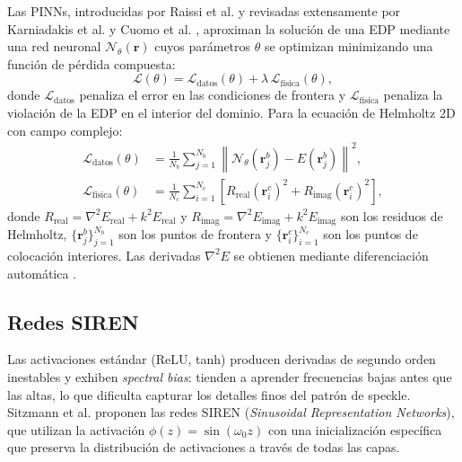 Las PINNs, introducidas por Raissi et al. \cite{Raissi2019_PINNs} y revisadas extensamente
por Karniadakis et al. \cite{Karniadakis2021_review} y Cuomo et al. \cite{Cuomo2022_review},
aproximan la solución de una EDP mediante una red neuronal $\mathcal{N}_\theta(\mathbf{r})$
cuyos parámetros $\theta$ se optimizan minimizando una función de pérdida compuesta:
%
\begin{equation}
  \mathcal{L}(\theta) = \mathcal{L}_{\mathrm{datos}}(\theta)
                      + \lambda\,\mathcal{L}_{\mathrm{física}}(\theta),
  \label{eq:loss_total}
\end{equation}
%
donde $\mathcal{L}_{\mathrm{datos}}$ penaliza el error en las condiciones de frontera y
$\mathcal{L}_{\mathrm{física}}$ penaliza la violación de la EDP en el interior del dominio.
Para la ecuación de Helmholtz 2D con campo complejo:
%
\begin{align}
  \mathcal{L}_{\mathrm{datos}}(\theta) &=
    \frac{1}{N_b}\sum_{j=1}^{N_b}
    \left\|\mathcal{N}_\theta(\mathbf{r}_j^b) - E(\mathbf{r}_j^b)\right\|^2,
  \label{eq:loss_datos} \\
  \mathcal{L}_{\mathrm{física}}(\theta) &=
    \frac{1}{N_c}\sum_{i=1}^{N_c}
    \left[R_{\mathrm{real}}(\mathbf{r}_i^c)^2 + R_{\mathrm{imag}}(\mathbf{r}_i^c)^2\right],
  \label{eq:loss_fisica}
\end{align}
%
donde $R_{\mathrm{real}} = \nabla^2 E_{\mathrm{real}} + k^2 E_{\mathrm{real}}$ y
$R_{\mathrm{imag}} = \nabla^2 E_{\mathrm{imag}} + k^2 E_{\mathrm{imag}}$ son los
residuos de Helmholtz, $\{\mathbf{r}_j^b\}_{j=1}^{N_b}$ son los puntos de frontera
y $\{\mathbf{r}_i^c\}_{i=1}^{N_c}$ son los puntos de colocación interiores.
Las derivadas $\nabla^2 E$ se obtienen mediante diferenciación automática \cite{Baydin2018_autodiff}.

\subsection{Redes SIREN}
\label{subsec:siren}

Las activaciones estándar (ReLU, tanh) producen derivadas de segundo orden inestables y
exhiben \textit{spectral bias}: tienden a aprender frecuencias bajas antes que las altas,
lo que dificulta capturar los detalles finos del patrón de speckle.
Sitzmann et al. \cite{Sitzmann2020_SIREN} proponen las redes SIREN (\textit{Sinusoidal
Representation Networks}), que utilizan la activación $\phi(z) = \sin(\omega_0 z)$ con una
inicialización específica que preserva la distribución de activaciones a través de todas
las capas.

